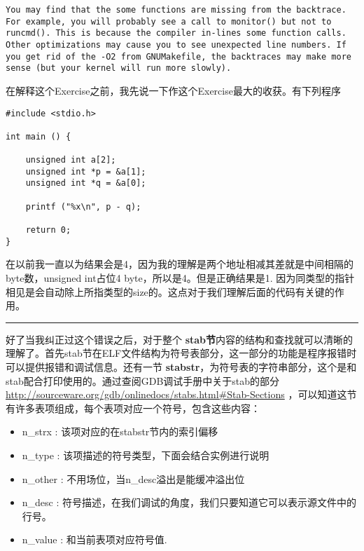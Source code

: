 \documentclass{article}
\newcommand{\highlight}[1]{{\bfseries \color{red}  #1}}
\newcommand{\funcname}[1]{{\ttfamily \small #1}}
\begin{document}
\begin{CJK*}{UTF8}{gkai}
\begin{lstlisting}[style=exercise]
You may find that the some functions are missing from the backtrace. For example, you will probably see a call to monitor() but not to runcmd(). This is because the compiler in-lines some function calls. Other optimizations may cause you to see unexpected line numbers. If you get rid of the -O2 from GNUMakefile, the backtraces may make more sense (but your kernel will run more slowly).
\end{lstlisting}

在解释这个Exercise之前，我先说一下作这个Exercise最大的收获。有下列程序

\begin{lstlisting}[style=ccode, title={\scriptsize \ttfamily \bfseries test.c}]
#include <stdio.h>

int main () {

    unsigned int a[2];
    unsigned int *p = &a[1];
    unsigned int *q = &a[0];

    printf ("%x\n", p - q); 

    return 0;
}
\end{lstlisting}

在以前我一直以为结果会是4，因为我的理解是两个地址相减其差就是中间相隔的byte数，unsigned int占位4 byte，所以是4。但是正确结果是1. 因为同类型的指针相见是会自动除上所指类型的size的。这点对于我们理解后面的代码有关键的作用。

\vspace{2em}

\hrule

\vspace{2em}

好了当我纠正过这个错误之后，对于整个\highlight{stab节}内容的结构和查找就可以清晰的理解了。首先stab节在ELF文件结构为符号表部分，这一部分的功能是程序报错时可以提供报错和调试信息。还有一节\highlight{stabstr}，为符号表的字符串部分，这个是和stab配合打印使用的。通过查阅GDB调试手册中关于stab的部分{\footnotesize \url{http://sourceware.org/gdb/onlinedocs/stabs.html#Stab-Sections}} ，可以知道这节有许多表项组成，每个表项对应一个符号，包含这些内容：

\begin{itemize}
\item{ \funcname{n\_strx} : 该项对应的在stabstr节内的索引偏移}
\item{ \funcname{n\_type} : 该项描述的符号类型，下面会结合实例进行说明} 
\item{ \funcname{n\_other} : 不用场位，当\funcname{n\_desc}溢出是能缓冲溢出位 }
\item{ \funcname{n\_desc} : 符号描述，在我们调试的角度，我们只要知道它可以表示源文件中的行号。}
\item{ \funcname{n\_value} : 和当前表项对应符号值.}
\end{itemize}


\end{CJK*}
\end{document}
